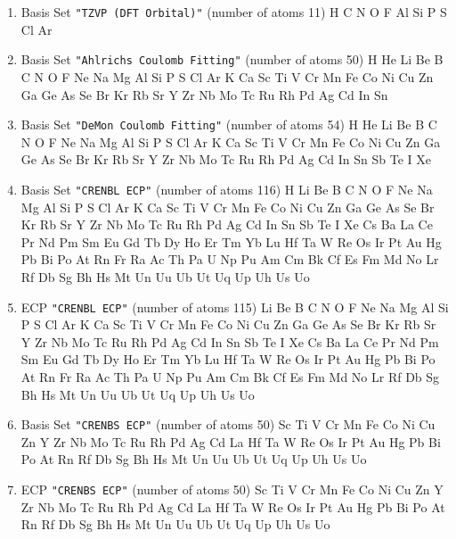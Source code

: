 \begin{enumerate}
\item Basis Set \verb#"TZVP (DFT Orbital)"# (number of atoms 11)  \newline 
  H C N O F Al Si P S Cl Ar


\item Basis Set \verb#"Ahlrichs Coulomb Fitting"# (number of atoms 50)  \newline 
  H He Li Be B C N O F Ne Na Mg Al Si P S Cl Ar K Ca Sc Ti V Cr Mn
 Fe Co Ni Cu Zn Ga Ge As Se Br Kr Rb Sr Y Zr Nb Mo Tc Ru Rh Pd Ag Cd In Sn



\item Basis Set \verb#"DeMon Coulomb Fitting"# (number of atoms 54)  \newline 
  H He Li Be B C N O F Ne Na Mg Al Si P S Cl Ar K Ca Sc Ti V Cr Mn
 Fe Co Ni Cu Zn Ga Ge As Se Br Kr Rb Sr Y Zr Nb Mo Tc Ru Rh Pd Ag Cd In Sn
 Sb Te I Xe


\item Basis Set \verb#"CRENBL ECP"# (number of atoms 116)  \newline 
  H Li Be B C N O F Ne Na Mg Al Si P S Cl Ar K Ca Sc Ti V Cr Mn Fe
 Co Ni Cu Zn Ga Ge As Se Br Kr Rb Sr Y Zr Nb Mo Tc Ru Rh Pd Ag Cd In Sn Sb
 Te I Xe Cs Ba La Ce Pr Nd Pm Sm Eu Gd Tb Dy Ho Er Tm Yb Lu Hf Ta W Re Os
 Ir Pt Au Hg Pb Bi Po At Rn Fr Ra Ac Th Pa U Np Pu Am Cm Bk Cf Es Fm Md No
 Lr Rf Db Sg Bh Hs Mt Un Uu Ub Ut Uq Up Uh Us Uo


\item ECP \verb#"CRENBL ECP"# (number of atoms 115)  \newline 
  Li Be B C N O F Ne Na Mg Al Si P S Cl Ar K Ca Sc Ti V Cr Mn Fe Co
 Ni Cu Zn Ga Ge As Se Br Kr Rb Sr Y Zr Nb Mo Tc Ru Rh Pd Ag Cd In Sn Sb Te
 I Xe Cs Ba La Ce Pr Nd Pm Sm Eu Gd Tb Dy Ho Er Tm Yb Lu Hf Ta W Re Os Ir
 Pt Au Hg Pb Bi Po At Rn Fr Ra Ac Th Pa U Np Pu Am Cm Bk Cf Es Fm Md No Lr
 Rf Db Sg Bh Hs Mt Un Uu Ub Ut Uq Up Uh Us Uo


\item Basis Set \verb#"CRENBS ECP"# (number of atoms 50)  \newline 
  Sc Ti V Cr Mn Fe Co Ni Cu Zn Y Zr Nb Mo Tc Ru Rh Pd Ag Cd La Hf Ta W Re
 Os Ir Pt Au Hg Pb Bi Po At Rn Rf Db Sg Bh Hs Mt Un Uu Ub Ut Uq Up Uh Us Uo



\item ECP \verb#"CRENBS ECP"# (number of atoms 50)  \newline 
  Sc Ti V Cr Mn Fe Co Ni Cu Zn Y Zr Nb Mo Tc Ru Rh Pd Ag Cd La Hf Ta W Re
 Os Ir Pt Au Hg Pb Bi Po At Rn Rf Db Sg Bh Hs Mt Un Uu Ub Ut Uq Up Uh Us Uo



\end{enumerate}
